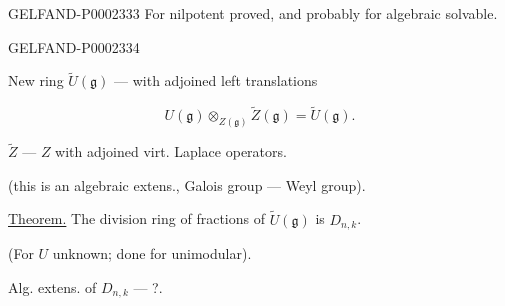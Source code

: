 \begin{GelfandAdjacentEvidence}{GELFAND-P000233}{3}
For nilpotent proved, and probably for algebraic solvable.




\end{GelfandAdjacentEvidence}
\begin{GelfandAdjacentEvidence}{GELFAND-P000233}{4}

New ring $\tilde U (\mathfrak g)$ — with adjoined left translations



\end{GelfandAdjacentEvidence}

\begin{equation*}
 U (\mathfrak g)\otimes_{Z (\mathfrak g)}\tilde Z (\mathfrak g)=\tilde U (\mathfrak g).
\end{equation*}



$\tilde Z$ — $Z$ with adjoined virt. Laplace operators.



(this is an algebraic extens., Galois group — Weyl group).



\underline{Theorem.} The division ring of fractions of $\tilde U (\mathfrak g)$ is $D_{n, k}$.



(For $U$ unknown; done for unimodular).



Alg. extens. of $D_{n, k}$ — ?.



